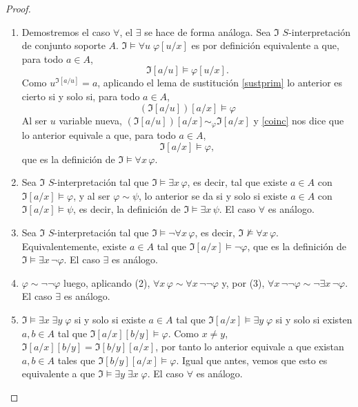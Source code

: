 \begin{proof} \mbox{}
\begin{enumerate}
    \item Demostremos el caso $\forall$, el $\exists$ se hace de forma análoga.
    Sea $\mathfrak{I}$ $S$-interpretación de conjunto soporte $A$. $\mathfrak{I} \vDash \forall u\;\varphi[u/x]$ es por definición equivalente a que, para todo $a \in A$, 
    $$\mathfrak{I}[a/u] \vDash \varphi[u/x].$$ 
    Como $u^{\mathfrak{I}[a/u]} = a$, aplicando el lema de sustitución \ref{sustprim} lo anterior es cierto si y solo si, para todo $a \in A$, 
    $$(\mathfrak{I}[a/u])[a/x]\vDash \varphi$$
    Al ser $u$ variable nueva, $(\mathfrak{I}[a/u])[a/x] \sim_{\varphi} \mathfrak{I}[a/x]$ y \ref{coinc} nos dice que lo anterior equivale a que, para todo $a \in A$, 
    $$\mathfrak{I}[a/x] \vDash \varphi,$$
    que es la definición de $\mathfrak{I} \vDash \forall x \, \varphi$.
    \item Sea $\mathfrak{I}$ $S$-interpretación tal que $\mathfrak{I} \vDash \exists x \, \varphi$, es decir, tal que existe $a \in A$ con $\mathfrak{I}[a/x] \vDash \varphi$, y al ser $\varphi \sim \psi$, lo anterior se da si y solo si existe $a \in A$ con $\mathfrak{I}[a/x] \vDash \psi$, es decir, la definición de $\mathfrak{I} \vDash \exists x \, \psi$. El caso $\forall$ es análogo.
    \item Sea $\mathfrak{I}$ $S$-interpretación tal que $\mathfrak{I} \vDash \neg \forall x \, \varphi$, es decir, $\mathfrak{I} \nvDash \forall x \, \varphi$. Equivalentemente, existe $a \in A$ tal que $\mathfrak{I}[a/x] \vDash \neg \varphi$, que es la definición de $\mathfrak{I} \vDash \exists x \, \neg \varphi$. El caso $\exists$ es análogo.
    \item $\varphi \sim \neg \neg \varphi$ luego, aplicando (2), $\forall x \, \varphi \sim \forall x \, \neg \neg \varphi$ y, por (3), $\forall x \, \neg \neg \varphi \sim \neg \exists x \, \neg \varphi$. El caso $\exists$ es análogo.
    \item $\mathfrak{I}\vDash \exists x\;\exists y\;\varphi$ si y solo si existe $a\in A$ tal que $\mathfrak{I}[a/x]\vDash\exists y\;\varphi$ si y solo si existen $a,b\in A$ tal que $\mathfrak{I}[a/x][b/y]\vDash\varphi$. Como $x\neq y$, $\mathfrak{I}[a/x][b/y]=\mathfrak{I}[b/y][a/x]$, por tanto lo anterior equivale a que existan $a,b\in A$ tales que $\mathfrak{I}[b/y][a/x]\vDash\varphi$. Igual que antes, vemos que esto es equivalente a que $\mathfrak{I}\vDash \exists y\;\exists x\;\varphi$. El caso $\forall$ es análogo.
    

\end{enumerate}
\end{proof}
